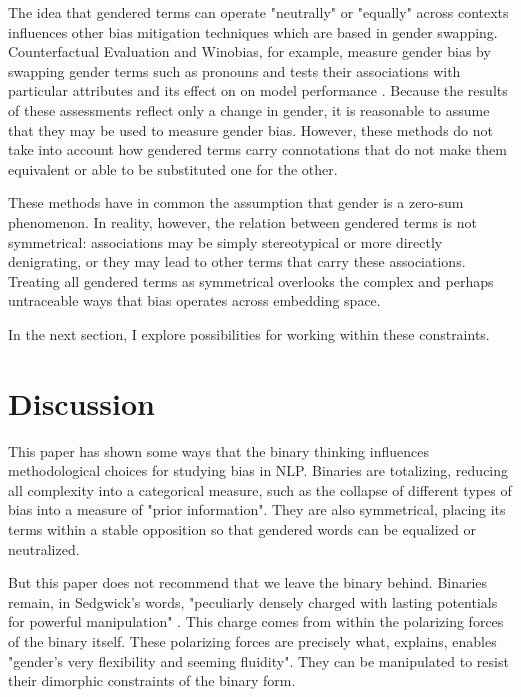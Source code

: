 \documentclass[11pt]{article}
\begin{document}
The idea that gendered terms can operate "neutrally" or "equally"
across contexts influences other bias mitigation techniques which are
based in gender swapping. Counterfactual Evaluation and Winobias, for
example, measure gender bias by swapping gender terms such as pronouns
and tests their associations with particular attributes and its effect
on on model performance \citep{nemani:2023,zhao:2018}. Because the
results of these assessments reflect only a change in gender, it is
reasonable to assume that they may be used to measure gender bias.
However, these methods do not take into account how gendered terms
carry connotations that do not make them equivalent or able to be
substituted one for the other.

These methods have in common the assumption that gender is a zero-sum
phenomenon. In reality, however, the relation between gendered terms
is not symmetrical: associations may be simply stereotypical or more
directly denigrating, or they may lead to other terms that carry these
associations. Treating all gendered terms as symmetrical overlooks the
complex and perhaps untraceable ways that bias operates across
embedding space.

In the next section, I explore possibilities for working within these
constraints.

\section{Discussion}

This paper has shown some ways that the binary thinking influences
methodological choices for studying bias in NLP. Binaries are
totalizing, reducing all complexity into a categorical measure, such
as the collapse of different types of bias into a measure of "prior
information". They are also symmetrical, placing its terms within a
stable opposition so that gendered words can be equalized or
neutralized.

But this paper does not recommend that we leave the binary behind.
Binaries remain, in Sedgwick's words, "peculiarly densely charged with
lasting potentials for powerful manipulation" \citep{sedgwick:1990}.
This charge comes from within the polarizing forces of the binary
itself. These polarizing forces are precisely
what, \citet{halberstam:1998} explains, enables "gender's very
flexibility and seeming fluidity". They can be manipulated to resist
their dimorphic constraints of the binary form.
\end{document}
